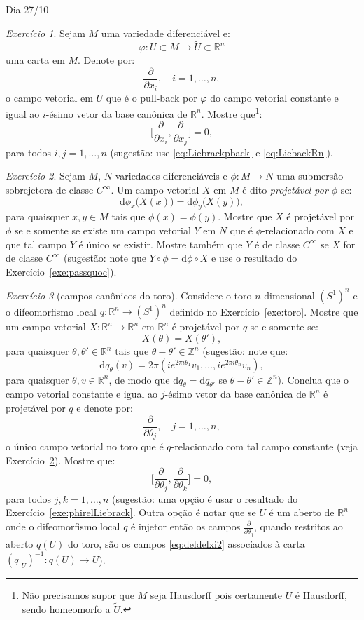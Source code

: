 \documentclass[oneside,11pt]{amsart}
\newcommand{\R}{\mathds R}
\newcommand{\Z}{\mathds Z}
\newcommand{\dd}{\mathrm d}
\theoremstyle{remark}\newtheorem{exercise}{Exercício}[section]
\theoremstyle{plain}\newtheorem{teo}{Teorema}[section]
\theoremstyle{plain}\newtheorem{lem}[teo]{Lema}
\theoremstyle{plain}\newtheorem{prop}[teo]{Proposição}
\theoremstyle{definition}\newtheorem{defin}[teo]{Definição}
\theoremstyle{remark}\newtheorem{rem}[teo]{Observação}
\theoremstyle{definition}\newtheorem{example}[teo]{Exemplo}
\numberwithin{equation}{section}
\begin{document}
\begin{section}{Dia 27/10}
\begin{exercise}
Sejam $M$ uma variedade diferenciável e:
\[\varphi:U\subset M\longrightarrow\widetilde U\subset\R^n\]
uma carta em $M$. Denote por:
\begin{equation}\label{eq:deldelxi2}
\frac{\partial}{\partial x_i},\quad i=1,\ldots,n,
\end{equation}
o campo vetorial em $U$ que é o pull-back por $\varphi$ do campo vetorial constante e igual ao $i$-ésimo vetor da base canônica de $\R^n$.
Mostre que\footnote{%
Não precisamos supor que $M$ seja Hausdorff pois certamente $U$ é Hausdorff, sendo homeomorfo a $\widetilde U$.}:
\[\Big[\frac{\partial}{\partial x_i},\frac{\partial}{\partial x_j}\Big]=0,\]
para todos $i,j=1,\ldots,n$ (sugestão: use \eqref{eq:Liebrackpback} e \eqref{eq:LiebackRn}).
\end{exercise}

\begin{exercise}\label{exe:phiprojetavel}
Sejam $M$, $N$ variedades diferenciáveis e $\phi:M\to N$ uma submersão sobrejetora de classe $C^\infty$. Um campo vetorial $X$ em $M$
é dito {\em projetável por $\phi$\/} se:
\[\dd\phi_x\big(X(x)\big)=\dd\phi_y\big(X(y)\big),\]
para quaisquer $x,y\in M$ tais que $\phi(x)=\phi(y)$. Mostre que $X$ é projetável por $\phi$ se e somente se existe um campo vetorial $Y$
em $N$ que é $\phi$-relacionado com $X$ e que tal campo $Y$ é único se existir. Mostre também que $Y$ é de classe $C^\infty$ se $X$ for de classe
$C^\infty$ (sugestão: note que $Y\circ\phi=\dd\phi\circ X$ e use o resultado do Exercício~\ref{exe:passquoc}).
\end{exercise}

\begin{exercise}[campos canônicos do toro]
Considere o toro $n$-dimensional $(S^1)^n$ e o difeomorfismo local $q:\R^n\to(S^1)^n$ definido no Exercício~\ref{exe:toro}.
Mostre que um campo vetorial $X:\R^n\to\R^n$ em $\R^n$ é projetável por $q$ se e somente se:
\[X(\theta)=X(\theta'),\]
para quaisquer $\theta,\theta'\in\R^n$ tais que $\theta-\theta'\in\Z^n$ (sugestão: note que:
\[\dd q_\theta(v)=2\pi(ie^{2\pi i\theta_1}v_1,\ldots,ie^{2\pi i\theta_n}v_n),\]
para quaisquer $\theta,v\in\R^n$, de modo que $\dd q_\theta=\dd q_{\theta'}$ se $\theta-\theta'\in\Z^n$).
Conclua que o campo vetorial constante e igual ao $j$-ésimo vetor da base canônica de $\R^n$ é projetável por $q$
e denote por:
\[\frac{\partial}{\partial\theta_j},\quad j=1,\ldots,n,\]
o único campo vetorial no toro que é $q$-relacionado com tal campo constante (veja Exercício~\ref{exe:phiprojetavel}). Mostre que:
\[\Big[\frac{\partial}{\partial\theta_j},\frac{\partial}{\partial\theta_k}\Big]=0,\]
para todos $j,k=1,\ldots,n$ (sugestão: uma opção é usar o resultado do Exercício~\ref{exe:phirelLiebrack}. Outra opção é notar que se $U$ é um aberto
de $\R^n$ onde o difeomorfismo local $q$ é injetor então os campos $\frac{\partial}{\partial\theta_j}$, quando restritos ao aberto $q(U)$ do toro,
são os campos \eqref{eq:deldelxi2} associados à carta $(q\vert_U)^{-1}:q(U)\to U$).
\end{exercise}


\end{section}
\end{document}
